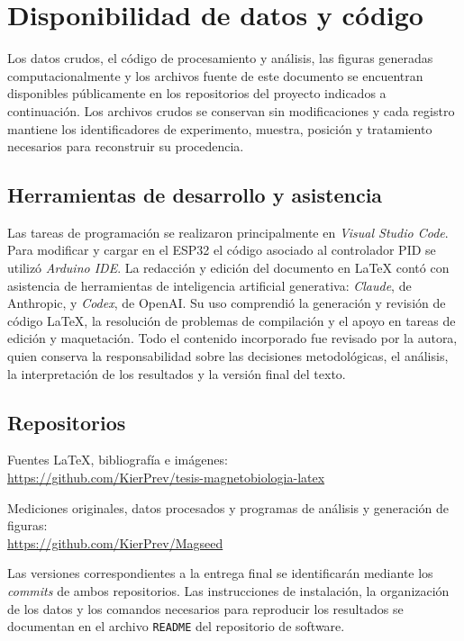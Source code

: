 
\chapter*{Disponibilidad de datos y código}

Los datos crudos, el código de procesamiento y análisis, las figuras generadas computacionalmente y los archivos fuente de este documento se encuentran disponibles públicamente en los repositorios del proyecto indicados a continuación. Los archivos crudos se conservan sin modificaciones y cada registro mantiene los identificadores de experimento, muestra, posición y tratamiento necesarios para reconstruir su procedencia.

\section*{Herramientas de desarrollo y asistencia}

Las tareas de programación se realizaron principalmente en \textit{Visual Studio Code}. Para modificar y cargar en el ESP32 el código asociado al controlador PID se utilizó \textit{Arduino IDE}. La redacción y edición del documento en \LaTeX{} contó con asistencia de herramientas de inteligencia artificial generativa: \textit{Claude}, de Anthropic, y \textit{Codex}, de OpenAI. Su uso comprendió la generación y revisión de código \LaTeX{}, la resolución de problemas de compilación y el apoyo en tareas de edición y maquetación. Todo el contenido incorporado fue revisado por la autora, quien conserva la responsabilidad sobre las decisiones metodológicas, el análisis, la interpretación de los resultados y la versión final del texto.

\section*{Repositorios}

\begin{description}\raggedright
  \item[Documento y bibliografía.] Fuentes \LaTeX, bibliografía e imágenes:\\
    \small\url{https://github.com/KierPrev/tesis-magnetobiologia-latex}
  \item[Datos y software.] Mediciones originales, datos procesados y programas de análisis y generación de figuras:\\
    \small\url{https://github.com/KierPrev/Magseed}
\end{description}

Las versiones correspondientes a la entrega final se identificarán mediante los \textit{commits} de ambos repositorios. Las instrucciones de instalación, la organización de los datos y los comandos necesarios para reproducir los resultados se documentan en el archivo \texttt{README} del repositorio de software.

\endinput

